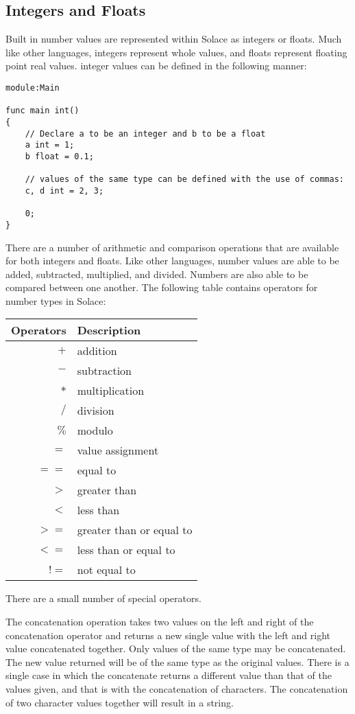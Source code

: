 \documentclass{article}
\begin{document}
\subsection{Integers and Floats}

Built in number values are represented within Solace as integers or floats. Much like other
languages, integers represent whole values, and floats represent floating point real values.
integer values can be defined in the following manner:

\begin{lstlisting}
module:Main

func main int()
{
	// Declare a to be an integer and b to be a float
	a int = 1;
	b float = 0.1;
	
	// values of the same type can be defined with the use of commas:
	c, d int = 2, 3;
	
	0;
}
\end{lstlisting}

There are a number of arithmetic and comparison operations that are available for both integers
and floats. Like other languages, number values are able to be added, subtracted, multiplied,
and divided. Numbers are also able to be compared between one another. The following table 
contains operators for number types in Solace:

\begin{center}
\begin{tabular}{|r|l|}
	\hline
	Operators & Description \\
	\hline
	\hline
	$+$ & addition \\
	$-$ & subtraction \\
	$*$ & multiplication \\
	$/$ & division \\
	$\%$ & modulo \\
	\hline
	$=$ & value assignment \\
	$==$ & equal to \\
	$>$ & greater than \\
	$<$ & less than \\
	$>=$ & greater than or equal to \\
	$<=$ & less than or equal to \\
	$!=$ & not equal to \\
	\hline
\end{tabular}
\end{center}

There are a small number of special operators. 

The concatenation operation takes two values
on the left and right of the concatenation operator and returns a new single value with
the left and right value concatenated together. Only values of the same type may be
concatenated. The new value returned will be of the same type as the original values.
There is a single case in which the concatenate returns a different value than that of the
values given, and that is with the concatenation of characters. The concatenation of two
character values together will result in a string.
\end{document}
